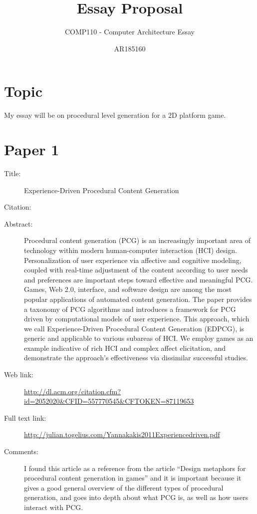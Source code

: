 \documentclass{scrartcl}
\title{Essay Proposal}
\subtitle{COMP110 - Computer Architecture Essay}
\author{AR185160}
\begin{document}
\maketitle

\section*{Topic}

My essay will be on procedural level generation for a 2D platform game.

\section*{Paper 1}

\begin{description}
\item[Title:] Experience-Driven Procedural Content Generation
\item[Citation:] \cite{yannakakis2011}
\item[Abstract:] Procedural content generation (PCG) is an increasingly important area of technology within modern human-computer interaction (HCI) design. Personalization of user experience via affective and cognitive modeling, coupled with real-time adjustment of the content according to user needs and preferences are important steps toward effective and meaningful PCG. Games, Web 2.0, interface, and software design are among the most popular applications of automated content generation. The paper provides a taxonomy of PCG algorithms and introduces a framework for PCG driven by computational models of user experience. This approach, which we call Experience-Driven Procedural Content Generation (EDPCG), is generic and applicable to various subareas of HCI. We employ games as an example indicative of rich HCI and complex affect elicitation, and demonstrate the approach's effectiveness via dissimilar successful studies.

\item[Web link:] \url{http://dl.acm.org/citation.cfm?id=2052020&CFID=557770545&CFTOKEN=87119653}
\item[Full text link:] \url{http://julian.togelius.com/Yannakakis2011Experiencedriven.pdf}
\item[Comments:] I found this article as a reference from the article ``Design metaphors for procedural content generation in games'' and it is important because it gives a good general overview of the different types of procedural generation, and goes into depth about what PCG is, as well as how users interact with PCG.
\end{description}
\end{document}
